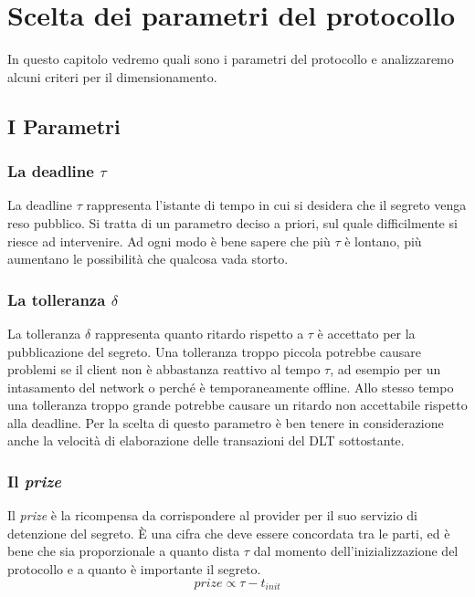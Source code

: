 \chapter{Scelta dei parametri del protocollo}
\label{chap:dimensionamento}

In questo capitolo vedremo quali sono i parametri del protocollo
e analizzaremo alcuni criteri per il dimensionamento.

\section{I Parametri}

\subsection{La deadline $ \tau $}
La deadline $ \tau $ rappresenta l'istante di tempo in cui
si desidera che il segreto venga reso pubblico.
Si tratta di un parametro deciso a priori, sul quale difficilmente si riesce ad
intervenire. Ad ogni modo è bene sapere che più $ \tau $ è lontano, più aumentano
le possibilità che qualcosa vada storto.

\subsection{La tolleranza $ \delta $}
La tolleranza $ \delta $ rappresenta quanto ritardo rispetto a $ \tau $ è
accettato per la pubblicazione del segreto. Una tolleranza troppo
piccola potrebbe causare problemi se il client non è abbastanza reattivo
al tempo $ \tau $, ad esempio
per un intasamento del network o
perché è
temporaneamente offline.
Allo stesso tempo una tolleranza
troppo grande potrebbe causare un ritardo non accettabile rispetto alla deadline.
Per la scelta di questo parametro è ben tenere in considerazione anche
la velocità di elaborazione delle transazioni
del DLT sottostante.

\subsection{Il \textit{prize}}
Il \textit{prize} è la ricompensa da corrispondere al provider per il suo servizio
di detenzione del segreto. È una cifra che deve essere concordata tra le parti,
ed è bene che sia proporzionale a quanto dista $ \tau $ dal momento
dell'inizializzazione del protocollo
e a quanto è importante il segreto.
$$ \textit{prize} \propto \tau - t_{init} $$

